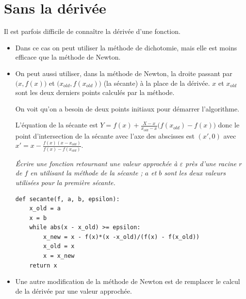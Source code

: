 \section{Sans la dérivée}
Il est parfois difficile de connaître la dérivée d'une fonction.

\begin{itemize}
    \item Dans ce cas on peut utiliser la méthode de dichotomie, mais elle est moins efficace que la méthode de Newton.

\item On peut aussi utiliser, dans la méthode de Newton, la droite passant par $\bigl(x, f(x)\bigr)$ et $\bigl(x_{old}, f(x_{old})\bigr)$ (la sécante) à la place de la dérivée. $x$ et $x_{old}$ sont les deux derniers points calculés par la méthode.

On voit qu'on a besoin de deux points initiaux pour démarrer l'algorithme.

L'équation de la sécante est $\displaystyle Y = f(x) +\frac{X - x}{x_{old} - x}\bigl(f(x_{old}) - f(x)\bigr)$ donc le point d'intersection de la sécante 
avec l'axe des abscisses est $(x', 0)$ avec $\displaystyle x' = x - \frac{f(x)(x - x_{old})}{f(x) - f(x_{old})}$.
\begin{Exercise}[title = Méthode de la sécante]\it
Écrire une fonction   retournant une valeur approchée à $\varepsilon$ près d'une racine $r$ de $f$ en utilisant la méthode de la sécante ; $a$ et $b$ sont les deux valeurs utilisées pour la première sécante.
\end{Exercise}
\begin{Answer}
\begin{lstlisting}
def secante(f, a, b, epsilon):
    x_old = a
    x = b
    while abs(x - x_old) >= epsilon:
        x_new = x - f(x)*(x -x_old)/(f(x) - f(x_old))
        x_old = x
        x = x_new
    return x
\end{lstlisting}
\end{Answer}
\item Une autre modification de la méthode de Newton est de remplacer le calcul de la dérivée par une valeur approchée.


\end{itemize}
